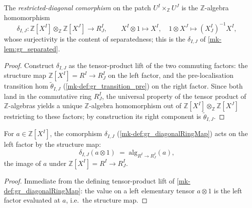 \begin{definition}\label{mk-def:gr_diagonalRingMap}
  \leanok

  The \emph{restricted-diagonal comorphism} on the patch \(U^I \times_{\mathbb{Z}}
  U^J\) is the \(\mathbb{Z}\)-algebra homomorphism
  \[
    \delta_{I,J} : \mathbb{Z}[X^I] \otimes_{\mathbb{Z}} \mathbb{Z}[X^J]
    \longrightarrow R^I_J,
    \qquad
    X^I \otimes 1 \mapsto X^I, \quad
    1 \otimes X^J \mapsto (X^I_J)^{-1} X^I,
  \]
  whose surjectivity is the content of separatedness; this is the \(\delta_{I,J}\)
  of \ref{mk-lem:gr_separated}.
\end{definition}
\begin{proof}
  \leanok
  Construct \(\delta_{I,J}\) as the tensor-product lift of the two commuting
  factors: the structure map \(\mathbb{Z}[X^I] = R^I \to R^I_J\) on the left
  factor, and the pre-localisation transition hom \(\tilde\theta_{I,J}\)
  (\ref{mk-def:gr_transition_pre}) on the right factor. Since both land in the
  commutative ring \(R^I_J\), the universal property of the tensor product of
  \(\mathbb{Z}\)-algebras yields a unique \(\mathbb{Z}\)-algebra homomorphism out
  of \(\mathbb{Z}[X^I] \otimes_{\mathbb{Z}} \mathbb{Z}[X^J]\) restricting to these
  factors; by construction its right component is \(\tilde\theta_{I,J}\).
\end{proof}

\begin{lemma}\label{mk-lem:gr_diagonalRingMap_left}
  \leanok

  For \(a \in \mathbb{Z}[X^I]\), the comorphism \(\delta_{I,J}\)
  (\ref{mk-def:gr_diagonalRingMap}) acts on the left factor by the structure map:
  \[
    \delta_{I,J}(a \otimes 1) \;=\; \mathrm{alg}_{R^I \to R^I_J}(a),
  \]
  the image of \(a\) under \(\mathbb{Z}[X^I] = R^I \to R^I_J\).
\end{lemma}
\begin{proof}
  \leanok
  Immediate from the defining tensor-product lift of
  \ref{mk-def:gr_diagonalRingMap}: the value on a left elementary tensor \(a \otimes
  1\) is the left factor evaluated at \(a\), i.e.\ the structure map.
\end{proof}

